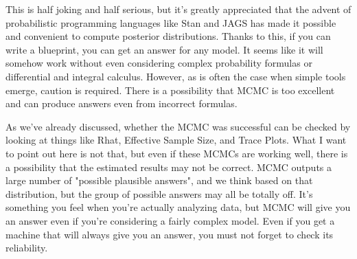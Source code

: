 \documentclass{ltjsbook}
\begin{document}
This is half joking and half serious, but it's greatly appreciated that the advent of probabilistic programming languages like Stan and JAGS has made it possible and convenient to compute posterior distributions. Thanks to this, if you can write a blueprint, you can get an answer for any model. It seems like it will somehow work without even considering complex probability formulas or differential and integral calculus.
However, as is often the case when simple tools emerge, caution is required. There is a possibility that MCMC is too excellent and can produce answers even from incorrect formulas.

As we've already discussed, whether the MCMC was successful can be checked by looking at things like Rhat, Effective Sample Size, and Trace Plots.
What I want to point out here is not that, but even if these MCMCs are working well, there is a possibility that the estimated results may not be correct. MCMC outputs a large number of "possible plausible answers", and we think based on that distribution, but the group of possible answers may all be totally off. It's something you feel when you're actually analyzing data, but MCMC will give you an answer even if you're considering a fairly complex model. Even if you get a machine that will always give you an answer, you must not forget to check its reliability.
\end{document}
